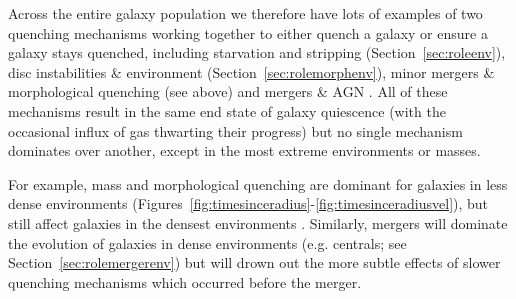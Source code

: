 \documentclass[useAMS,usenatbib]{mn2e}
\def\minor		{\color{minorcol}}
\begin{document}
Across the entire galaxy population we therefore have lots of examples of two quenching mechanisms working together to either quench a galaxy or ensure a galaxy stays quenched, including starvation and stripping (Section~\ref{sec:roleenv}), disc instabilities \&  environment (Section~\ref{sec:rolemorphenv}), minor mergers \& morphological quenching (see above) and mergers \& AGN \citep{smethurst15, smethurst16}. All of these mechanisms result in the same end state of galaxy quiescence (with the occasional influx of gas thwarting their progress) but no single mechanism dominates over another, except in the most extreme environments or masses. 

{\minor For example, mass and morphological quenching are dominant for galaxies in less dense environments (Figures~\ref{fig:timesinceradius}-\ref{fig:timesinceradiusvel}), but still affect galaxies in the densest environments \citep[e.g.][]{darvish16}. Similarly, mergers will dominate the evolution of galaxies in dense environments (e.g. centrals; see Section~\ref{sec:rolemergerenv}) but will drown out the more subtle effects of slower quenching mechanisms which occurred before the merger.} %

\end{document}
